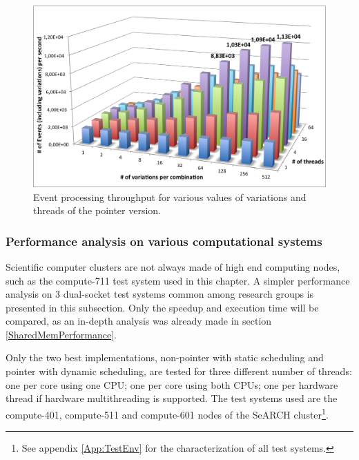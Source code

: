 \begin{figure}[!htp]
	\begin{center}
		\includegraphics[scale=0.6]{../../common/graphs/throughput_pointer.png}
		\caption{Event processing throughput for various values of variations and threads of the pointer version.}
		\label{fig:EventThroughputPointer}
	\end{center}
\end{figure}

\subsubsection{Performance analysis on various computational systems}
\label{SharedMemPerformanceVarious}

Scientific computer clusters are not always made of high end computing nodes, such as the compute-711 test system used in this chapter. A simpler performance analysis on 3 dual-socket test systems common among research groups is presented in this subsection. Only the speedup and execution time will be compared, as an in-depth analysis was already made in section \ref{SharedMemPerformance}.

Only the two best implementations, non-pointer with static scheduling and pointer with dynamic scheduling, are tested for three different number of threads: one per core using one CPU; one per core using both CPUs; one per hardware thread if hardware multithreading is supported. The test systems used are the compute-401, compute-511 and compute-601 nodes of the SeARCH cluster\footnote{See appendix \ref{App:TestEnv} for the characterization of all test systems.}.

